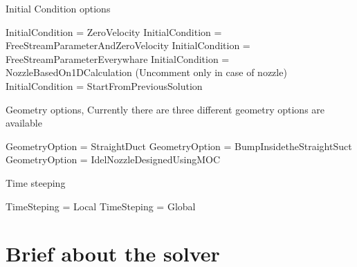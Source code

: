 \begin{DoxyEnumerate}
\item Initial Condition options \begin{DoxyVerb} InitialCondition = ZeroVelocity
 InitialCondition = FreeStreamParameterAndZeroVelocity
 InitialCondition = FreeStreamParameterEverywhare
 InitialCondition = NozzleBasedOn1DCalculation
 (Uncomment only in case of nozzle)
 InitialCondition = StartFromPreviousSolution
\end{DoxyVerb}

\item Geometry options, Currently there are three different geometry options are available \begin{DoxyVerb}GeometryOption = StraightDuct
GeometryOption = BumpInsidetheStraightSuct
GeometryOption = IdelNozzleDesignedUsingMOC
\end{DoxyVerb}

\item Time steeping \begin{DoxyVerb}TimeSteping = Local
TimeSteping = Global    
\end{DoxyVerb}

\end{DoxyEnumerate}\hypertarget{index_brief}{}\section{Brief about the solver}\label{index_brief}

